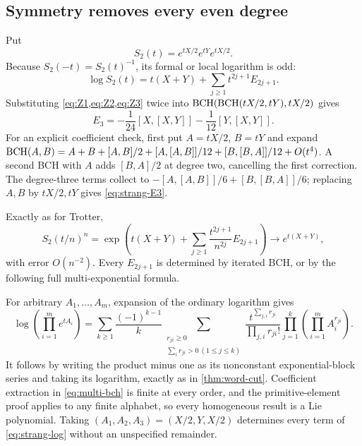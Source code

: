 \subsection{Symmetry removes every even degree}
Put
\begin{equation}\label{eq:strang}
 S_2(t)=e^{tX/2}e^{tY}e^{tX/2}.
\end{equation}
Because $S_2(-t)=S_2(t)^{-1}$, its formal or local logarithm is odd:
\begin{equation}\label{eq:strang-log}
 \log S_2(t)=t(X+Y)+\sum_{j\geq1}t^{2j+1}E_{2j+1}.
\end{equation}
Substituting \cref{eq:Z1,eq:Z2,eq:Z3} twice into
$\operatorname{BCH}(\operatorname{BCH}(tX/2,tY),tX/2)$ gives
\begin{equation}\label{eq:strang-E3}
 E_3=-\frac1{24}[X,[X,Y]]-\frac1{12}[Y,[X,Y]].
\end{equation}
For an explicit coefficient check, first put $A=tX/2$, $B=tY$ and expand
$\operatorname{BCH}(A,B)=A+B+[A,B]/2+[A,[A,B]]/12+[B,[B,A]]/12+O(t^4)$.
A second BCH with $A$ adds $[B,A]/2$ at degree two, cancelling the first correction. The degree-three terms collect to
$-[A,[A,B]]/6+[B,[B,A]]/6$; replacing $A,B$ by $tX/2,tY$ gives \cref{eq:strang-E3}.

Exactly as for Trotter,
\begin{equation}\label{eq:strang-all}
 S_2(t/n)^n=\exp\!\left(t(X+Y)+
        \sum_{j\geq1}\frac{t^{2j+1}}{n^{2j}}E_{2j+1}\right)
 \longrightarrow e^{t(X+Y)},
\end{equation}
with error $O(n^{-2})$. Every $E_{2j+1}$ is determined by iterated BCH, or by the following full multi-exponential formula.

For arbitrary $A_1,\ldots,A_m$, expansion of the ordinary logarithm gives
\begin{equation}\label{eq:multi-bch}
 \log\!\left(\prod_{i=1}^{m}e^{tA_i}\right)
 =\sum_{k\geq1}\frac{(-1)^{k-1}}{k}
 \sum_{\substack{r_{ji}\geq0\\\sum_i r_{ji}>0\ (1\leq j\leq k)}}
 \frac{t^{\sum_{j,i}r_{ji}}}
      {\prod_{j,i}r_{ji}!}
 \prod_{j=1}^{k}\left(\prod_{i=1}^{m}A_i^{r_{ji}}\right).
\end{equation}
It follows by writing the product minus one as its nonconstant exponential-block series and taking its logarithm, exactly as in \cref{thm:word-cut}. Coefficient extraction in \cref{eq:multi-bch} is finite at every order, and the primitive-element proof applies to any finite alphabet, so every homogeneous result is a Lie polynomial. Taking $(A_1,A_2,A_3)=(X/2,Y,X/2)$ determines every term of \cref{eq:strang-log} without an unspecified remainder.

